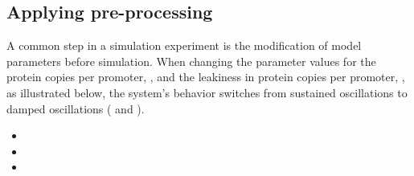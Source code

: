 \subsection{Applying pre-processing}
\label{sec:preprocessing}
A common step in a simulation experiment is the modification of model parameters before simulation. When changing the parameter values for the protein copies per promoter, , and the leakiness in protein copies per promoter, , as illustrated below, the system's behavior switches from sustained oscillations to damped oscillations ( and ).

\begin{itemize}
	\item{}
	\item{}
	\item{}
\end{itemize}

\pagebreak

